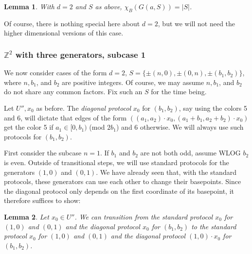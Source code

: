 \documentclass[12pt]{article}
\newcommand{\0}{\varnothing}
\newcommand{\Z}{\mathbb{Z}}
\newtheorem{lemma}{Lemma}
\begin{document}
\begin{lemma}\label{lem:mult}
With $d=2$ and $S$ as above, $\chi_B(G(a,S)) = |S|$.
\end{lemma}

Of course, there is nothing special here about $d=2$, but we will not need the higher dimensional versions of this case.

\subsubsection{$\Z^2$ with three generators, subcase 1}\label{subsubsec:3gen1}

We now consider cases of the form $d = 2$, $S = \{\pm(n,0),\pm(0,n),\pm(b_1,b_2)\}$, where $n,b_1$, and $b_2$ are positive integers. Of course, we may assume $n,b_1$, and $b_2$ do not share any common factors. Fix such an $S$ for the time being.

Let $U'', x_0$ as before. The \textit{diagonal protocol} $x_0$ for $(b_1,b_2)$, say using the colors 5 and 6, will dictate that edges of the form $((a_1,a_2) \cdot x_0 , (a_1+b_1,a_2+b_2) \cdot x_0)$ get the color 5 if $a_1 \in [0,b_1)$ (mod $2b_1$) and 6 otherwise. We will always use such protocols for $(b_1,b_2)$.

First consider the subcase $n = 1$. If $b_1$ and $b_2$ are not both odd, assume WLOG $b_2$ is even. Outside of transitional steps, we will use standard protocols for the generators $(1,0)$ and $(0,1)$. We have already seen that, with the standard protocols, these generators can use each other to change their basepoints. Since the diagonal protocol only depends on the first coordinate of its basepoint, it therefore suffices to show:

\begin{lemma}\label{lem:3gentrans1}
Let $x_0 \in U''$. We can transition from the standard protocol $x_0$ for $(1,0)$ and $(0,1)$ and the diagonal protocol $x_0$ for $(b_1,b_2)$ to the standard protocol $x_0$ for $(1,0)$ and $(0,1)$ and the diagonal protocol $(1,0) \cdot x_0$ for $(b_1,b_2)$.
\end{lemma}
\end{document}
